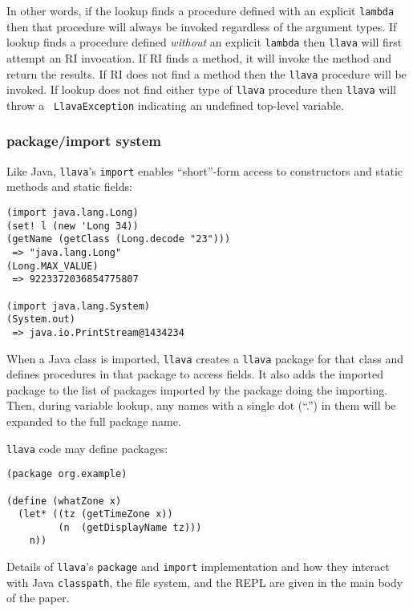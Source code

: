 \documentclass{acm-final/sig-alternate-modified}
\begin{document}
In other words, if the lookup finds a procedure defined with an
explicit {\tt lambda} then that procedure will always be invoked
regardless of the argument types.  If lookup finds a procedure defined
\emph{without} an explicit {\tt lambda} then {\tt llava} will first
attempt an RI invocation.  If RI finds a method, it will invoke the
method and return the results.  If RI does not find a method then the
{\tt llava} procedure will be invoked.  If lookup does not find either
type of {\tt llava} procedure then {\tt llava} will throw a {\tt
LlavaException} indicating an undefined top-level variable.

\subsubsection{package/import system}

Like Java, {\tt llava}'s {\tt import} enables ``short''-form access to
constructors and static methods and static fields:

\small
\begin{verbatim}
(import java.lang.Long)
(set! l (new 'Long 34))
(getName (getClass (Long.decode "23")))
 => "java.lang.Long"
(Long.MAX_VALUE)
 => 9223372036854775807

(import java.lang.System)
(System.out)
 => java.io.PrintStream@1434234
\end{verbatim}
\normalsize

When a Java class is imported, {\tt llava} creates a {\tt llava}
package for that class and defines procedures in that package to
access fields.  It also adds the imported package to the list of
packages imported by the package doing the importing.  Then, during
variable lookup, any names with a single dot (``.'') in them will be
expanded to the full package name.


{\tt llava} code may define packages:

\small
\begin{verbatim}
(package org.example)

(define (whatZone x)
  (let* ((tz (getTimeZone x))
         (n  (getDisplayName tz)))
    n))
\end{verbatim}
\normalsize


Details of {\tt llava}'s {\tt package} and {\tt import} implementation
and how they interact with Java {\tt classpath}, the file system, and
the REPL are given in the main body of the paper.
\end{document}
